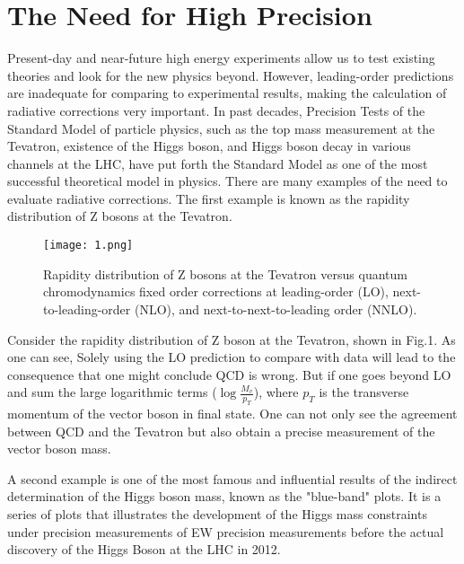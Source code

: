 \documentclass[secnumarabic, graphics,floatfix,nofootinbib,amsmath
tightenlines,nobibnotes,aps,prl,12pt]{revtex4-1}
\begin{document}
\section{\label{sec:level1}The Need for High Precision}
 Present-day and near-future high energy experiments allow us to test existing theories and look for the new physics beyond.  However,  leading-order predictions are inadequate for comparing to experimental results, making the calculation of radiative corrections very important. In past decades, Precision Tests of the Standard Model of particle physics, such as the top mass measurement at the Tevatron, existence of the Higgs boson, and Higgs boson decay in various channels at the LHC, have put forth the Standard Model as one of the most successful theoretical model in physics. There are many examples of the need to evaluate radiative corrections. The first example is known as the rapidity distribution of Z bosons at the Tevatron.
\begin{figure}[h]
\texttt{[image: 1.png]}
\caption{Rapidity distribution of Z bosons at the Tevatron versus quantum chromodynamics fixed order corrections at leading-order (LO), next-to-leading-order (NLO), and next-to-next-to-leading order (NNLO)\cite{Anastasiou:2003ds}.}
\end{figure}
Consider the rapidity distribution of Z boson at the Tevatron, shown in Fig.1.
As one can see, Solely using the LO prediction to compare with data will lead to the consequence that one might conclude QCD is wrong.  But if one goes beyond LO and sum the large logarithmic terms ($\log{\frac{M_v}{ p_T }}$), where $p_T$ is the transverse momentum of the vector boson in final state. One can not only see the agreement between QCD and the Tevatron but also obtain a precise measurement of the vector boson mass. 

A second example is one of the most famous and influential results of the indirect determination of the Higgs boson mass, known as the "blue-band" plots. It is a series of plots that illustrates the development of the Higgs mass constraints under precision measurements of EW precision measurements before the actual discovery of the Higgs Boson at the LHC in 2012.
\end{document}
